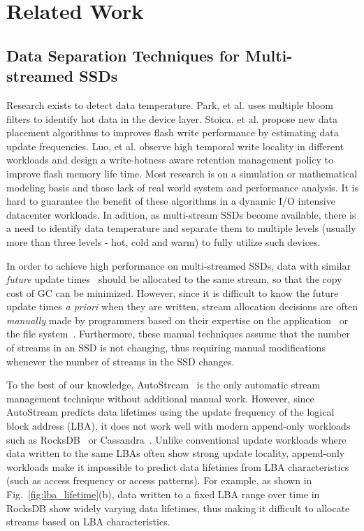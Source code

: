 
\chapter{Related Work} 
\label{chap:Background}

\section{Data Separation Techniques for Multi-streamed SSDs}
Research exists to detect data temperature. Park, et al. uses multiple bloom
filters to identify hot data in the device layer. Stoica, et
al. propose new data placement algorithms to improves
flash write performance by estimating data update frequencies.
Luo, et al. observe high temporal write
locality in different workloads and design a write-hotness
aware retention management policy to improve flash memory
life time. Most research is on a simulation or mathematical
modeling basis and those lack of real world system and
performance analysis. It is hard to guarantee the benefit
of these algorithms in a dynamic I/O intensive datacenter
workloads. In adition, as multi-stream SSDs
become available, there is a need to identify data temperature
and separate them to multiple levels (usually more
than three levels - hot, cold and warm) to fully utilize such
devices.

In order to achieve high performance on multi-streamed SSDs, data with similar 
{\it future} update times~\cite{PCHa}
should be allocated 
to the same stream, so that the copy cost of GC can be minimized.
However, since it is difficult to know the future update times {\it a priori} when they are written,
stream allocation decisions are often {\it manually} made 
by programmers based on their expertise
on the application~\cite{MultiStream, Level} or the file system~\cite{FStream}.  
Furthermore, these manual techniques assume 
that the number of streams in an SSD is not changing, 
thus requiring manual modifications whenever the number of streams in the SSD changes.

To the best of our knowledge, \textsf{\small AutoStream}~\cite{AutoStream} is the only automatic 
stream management technique
without additional manual work.  
However, since \textsf{\small AutoStream} predicts data lifetimes using the update frequency 
of the logical block address (LBA), it does not work well with modern append-only workloads 
such as RocksDB~\cite{RocksDB} or Cassandra~\cite{Cassandra}.  
Unlike conventional update workloads where data written to the same LBAs 
often show strong update locality, 
append-only workloads make it impossible to predict data lifetimes 
from LBA characteristics (such as access frequency or access patterns).  
For example, as shown in Fig.~\ref{fig:lba_lifetime}(b), 
data written to a fixed LBA range over time in RocksDB 
show widely varying data lifetimes, 
thus making it difficult to allocate streams based on LBA characteristics.


